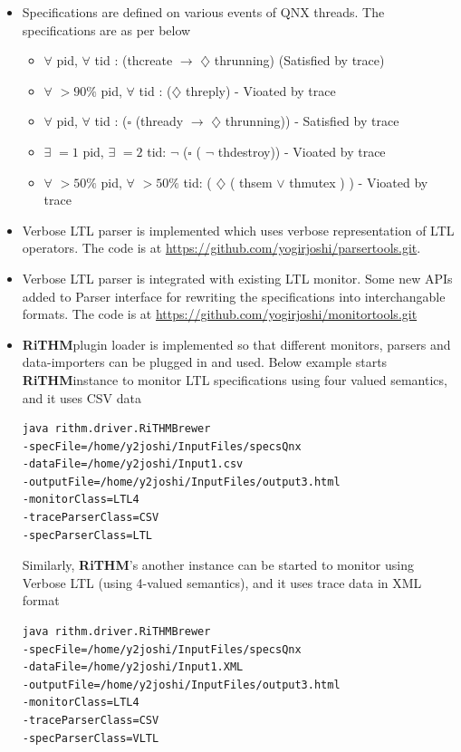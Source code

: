 \documentclass[]{article}
\newcommand{\rithm}{\textbf{RiTHM}\space}
\begin{document}
\begin{itemize}
	\item Specifications are defined on various events of QNX threads. The specifications are as per below
	\begin{itemize}
		\item $\forall$  pid, $\forall$ tid : (thcreate $\longrightarrow$  $\diamondsuit$ thrunning)  (Satisfied by trace)
		\item $\forall$ $>90\%$ pid, $\forall$ tid : ($\diamondsuit$ threply) - Vioated by trace
		\item $\forall$  pid, $\forall$ tid : ($\square$ (thready $\longrightarrow$   $\diamondsuit$ thrunning)) - Satisfied by trace
		\item $\exists$ $=1$ pid, $\exists$ $=2$ tid: $\lnot$ ($\square$ ( $\lnot$ thdestroy)) - Vioated by trace
		\item $\forall$ $>50\%$ pid, $\forall$ $>50\%$ tid: ( $\diamondsuit$ ( thsem $\vee$ thmutex ) ) - Vioated by trace
	\end{itemize}
	
\item
Verbose LTL parser is implemented which uses verbose representation of LTL operators. \newline
The code is at \url{https://github.com/yogirjoshi/parsertools.git}.

\item
Verbose LTL parser is integrated with existing LTL monitor. Some new APIs added to Parser interface for rewriting the specifications into interchangable formats. The code is at \url{https://github.com/yogirjoshi/monitortools.git}

\item
\rithm plugin loader is implemented so that different monitors, parsers and data-importers can be plugged in and used. \newline
Below example starts \rithm instance to monitor LTL specifications using four valued semantics, and it uses CSV data
\begin{lstlisting}
java rithm.driver.RiTHMBrewer 
-specFile=/home/y2joshi/InputFiles/specsQnx 
-dataFile=/home/y2joshi/Input1.csv
-outputFile=/home/y2joshi/InputFiles/output3.html 
-monitorClass=LTL4 
-traceParserClass=CSV 
-specParserClass=LTL
\end{lstlisting}
Similarly, \rithm's another instance can be started to monitor using Verbose LTL (using 4-valued semantics), and it uses trace data in XML format 
\begin{lstlisting}
java rithm.driver.RiTHMBrewer 
-specFile=/home/y2joshi/InputFiles/specsQnx 
-dataFile=/home/y2joshi/Input1.XML
-outputFile=/home/y2joshi/InputFiles/output3.html 
-monitorClass=LTL4 
-traceParserClass=CSV 
-specParserClass=VLTL
\end{lstlisting}



\end{itemize}
\end{document}
